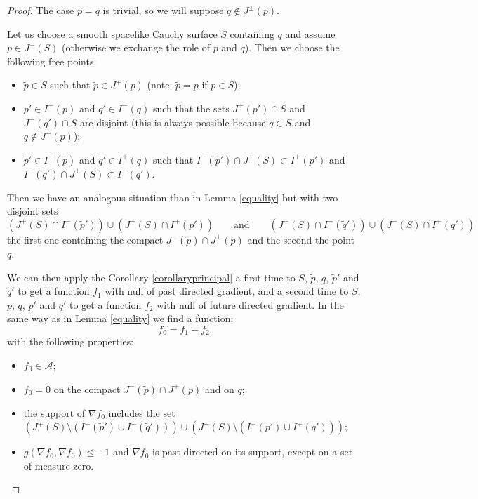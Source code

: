 \documentclass[pdftex]{sigma}
\newcommand{\parenthese}[1]{\left( {#1} \right)}
\begin{document}
\begin{proof}
The case $p=q$ is trivial, so we will suppose $q\notin J^{\pm}(p)$.

Let us choose a smooth spacelike Cauchy surface $S$ containing $q$ and assume $p \in J^-(S)$ (otherwise we exchange the role of $p$ and $q$). Then we choose the following free points:
\begin{itemize}\itemsep=0pt
\item $\tilde p \in S$ such that $\tilde p \in J^+(p)$ (note: $\tilde p = p$ if $p\in S$);
\item $p' \in I^-(p)$ and $q' \in I^-(q)$ such that the sets $J^+(p') \cap S$ and $J^+(q') \cap S$ are disjoint (this is always possible because $q\in S$ and $q\notin J^{+}(p)$);
\item $\tilde p' \in I^+(\tilde p)$ and $\tilde q' \in I^+(q)$ such that $I^-(\tilde p') \cap J^+(S) \subset I^+(p')$ and $I^-(\tilde q') \cap J^+(S) \subset I^+(q')$.
\end{itemize}
Then we have an analogous situation than in Lemma \ref{equality} but with two disjoint sets
\[
\parenthese{J^+(S) \cap I^-(\tilde p')} \cup  \parenthese{J^-(S) \cap I^+(p')}\qquad\text{and}\qquad\parenthese{J^+(S) \cap I^-(\tilde q')} \cup  \parenthese{J^-(S) \cap I^+(q')}
\]
the f\/irst one containing the compact $J^-(\tilde p) \cap J^+(p)$ and the second the point $q$.

We can then apply the Corollary \ref{corollaryprincipal} a f\/irst time to $S$, $\tilde p$, $q$, $\tilde p'$ and $\tilde q'$ to get a function $f_1$ with null of past directed gradient, and a second time to $S$, $p$, $q$, $p'$ and $q'$ to get a function $f_2$ with null of future directed gradient. In the same way as in Lemma \ref{equality} we f\/ind a function:
\[
f_0 = f_1 - f_2
\]
with the following properties:
\begin{itemize}\itemsep=0pt
\item $f_0\in\mathcal A$;
\item $f_0 = 0$ on the compact $J^-(\tilde p) \cap J^+(p)$ and on $q$;
\item the support of $\nabla f_0$ includes the set $\parenthese{J^+(S) \!\setminus \! \parenthese{I^-(\tilde p') \cup I^-(\tilde q')}} \cup    \parenthese{J^-(S)\! \setminus \!\parenthese{I^+(p') \cup I^+(q') }}$;
\item $g( \nabla f_0, \nabla f_0) \leq -1$ and $\nabla f_0$ is past directed on its support, except on a set of measure zero.
\end{itemize}


\end{proof}
\end{document}

